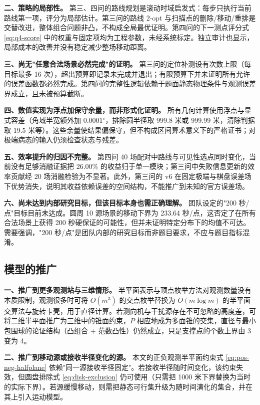 \textbf{二、策略的局部性。} 第三、四问的路线规划是滚动时域启发式：每步只执行当前路线第一项，评分为局部估计。第三问的路线 2-opt 与扫描点的删除/移动/重排是交替改进，整体组合问题非凸，不构成全局最优证明。第四问的下一测点评分式 \eqref{eq:q4-score} 中的权重与固定项均为工程参数，未经系统标定。独立审计也显示，局部成本的改善并没有稳定减少整场移动距离。

\textbf{三、尚无"任意合法场景必然完成"的证明。} 第三问的定位补测设有次数上限（每目标最多 16 次），超出预算即记录未完成并退出；有限预算下并未证明所有允许的误差函数都必然完成。第四问的完整性逻辑依赖于题面静态物理条件与观测误差界成立，且未被预算截断。

\textbf{四、数值实现为浮点加保守余量，而非形式化证明。} 所有几何计算使用浮点与显式容差（角域半宽额外加 0.0001$^\circ$，排除圆半径取 999.8 米或 999.99 米，清除判据取 19.5 米等）。这些余量使结果偏保守，但不构成区间算术意义下的严格证书；对极端病态的输入仍须检查状态与残差。

\textbf{五、效率提升的归因不完整。} 第四问 40 场配对中路线与可见性选点同时变化，当前没有足够消融证据把 26.00\% 的收益归于单一模块；第三问中失败信息更新的效率贡献经 20 场消融检验为不显著。此外，第三问的 v6 在固定极端与棋盘误差场下优势消失，说明其收益依赖误差的空间结构，不能推广到未知的官方误差场。

\textbf{六、尚未达到内部研究目标，但该目标本身也需正确理解。} 团队设定的"200 秒/点"目标目前未达成。圆周 10 源场景的移动下界为 233.64 秒/点，这否定了在所有合法场景上获得 200 秒硬保证的可能性，但并未证明特定分布下的均值不可达。需要强调，"200 秒/点"是团队内部的研究目标而非题目要求，不应与题目指标混淆。

\subsection{模型的推广}

\textbf{一、推广到更多观测站与三维情形。} 半平面表示与顶点枚举方法对观测数量没有本质限制，观测很多时可将 $O(m^3)$ 的交点枚举替换为 $O(m\log m)$ 的半平面交算法与旋转卡壳，用于直径计算。若测向机与干扰源存在不可忽略的高度差，可将二维半平面推广为三维中的锥面约束，$P$ 相应地成为多面锥的交集，直径与最小包围球的论证结构（凸组合 + 范数凸性）仍然成立，只是支撑点的个数上界由 3 变为 4。

\textbf{二、推广到移动源或接收半径变化的源。} 本文的正负观测半平面约束式 \eqref{eq:pos-neg-halfplane} 依赖"同一源接收半径固定"。若接收半径随时间变化，该约束失效，但圆盘排除式 \eqref{eq:disk-exclusion} 仍可使用（只需把 1000 米下界替换为当时的实际下界）。若源缓慢移动，则需把静态可行集升级为随时间演化的集合，并在其上引入运动模型。


